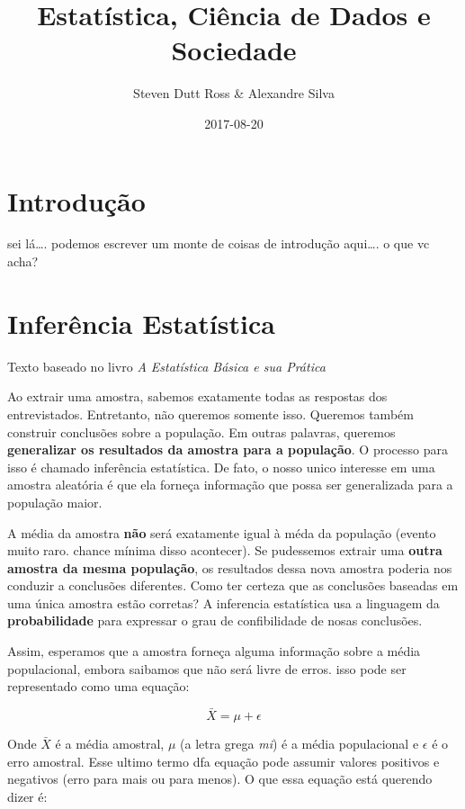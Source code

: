 \documentclass[]{book}
\title{Estatística, Ciência de Dados e Sociedade}
\author{Steven Dutt Ross \& Alexandre Silva}
\date{2017-08-20}
\theoremstyle{definition}
\theoremstyle{definition}
\theoremstyle{definition}
\theoremstyle{remark}
\begin{document}
\maketitle

{
\setcounter{tocdepth}{1}
\tableofcontents
}
\chapter{Introdução}\label{introducao}

sei lá\ldots{}. podemos escrever um monte de coisas de introdução
aqui\ldots{}. o que vc acha?

\chapter{Inferência Estatística}\label{inferencia-estatistica}

Texto baseado no livro \emph{A Estatística Básica e sua Prática}
\citet{Moore}

Ao extrair uma amostra, sabemos exatamente todas as respostas dos
entrevistados. Entretanto, não queremos somente isso. Queremos também
construir conclusões sobre a população. Em outras palavras, queremos
\textbf{generalizar os resultados da amostra para a população}. O
processo para isso é chamado inferência estatística. De fato, o nosso
unico interesse em uma amostra aleatória é que ela forneça informação
que possa ser generalizada para a população maior.

A média da amostra \textbf{não} será exatamente igual à méda da
população (evento muito raro. chance mínima disso acontecer). Se
pudessemos extrair uma \textbf{outra amostra da mesma população}, os
resultados dessa nova amostra poderia nos conduzir a conclusões
diferentes. Como ter certeza que as conclusões baseadas em uma única
amostra estão corretas? A inferencia estatística usa a linguagem da
\textbf{probabilidade} para expressar o grau de confibilidade de nosas
conclusões.

Assim, esperamos que a amostra forneça alguma informação sobre a média
populacional, embora saibamos que não será livre de erros. isso pode ser
representado como uma equação:

\[\bar{X}=\mu+\epsilon\]

Onde \(\bar{X}\) é a média amostral, \(\mu\) (a letra grega \emph{mi}) é
a média populacional e \(\epsilon\) é o erro amostral. Esse ultimo termo
dfa equação pode assumir valores positivos e negativos (erro para mais
ou para menos). O que essa equação está querendo dizer é:
\end{document}
